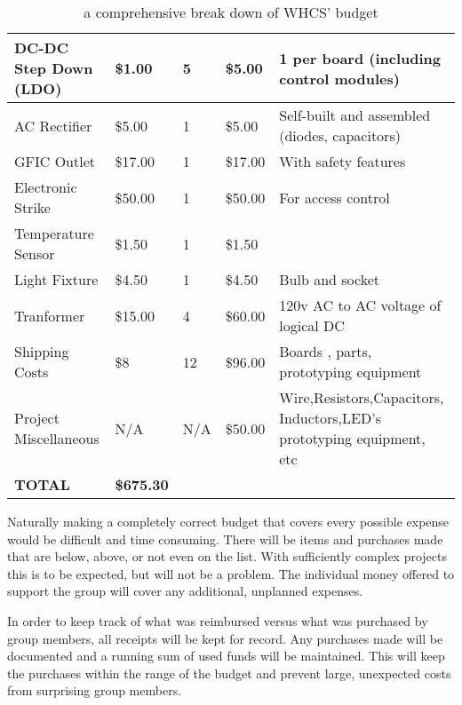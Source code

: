 \begin{table}[H]
{\begin{tabular}{|l|l|l|l|b{4cm}|}
{\color{black} DC{}-DC Step Down (LDO)} &
{\color{black} \$1.00} &
{\color{black} 5} &
{\color{black} \$5.00} &
{\color{black} 1 per board (including control modules)}\\\hline
{\color{black} AC Rectifier} &
{\color{black} \$5.00} &
{\color{black} 1} &
{\color{black} \$5.00} &
{\color{black} Self{}-built and assembled (diodes, capacitors)}\\\hline
{\color{black} GFIC Outlet} &
{\color{black} \$17.00} &
{\color{black} 1} &
{\color{black} \$17.00} &
{\color{black} With safety features}\\\hline
{\color{black} Electronic Strike} &
{\color{black} \$50.00} &
{\color{black} 1} &
{\color{black} \$50.00} &
{\color{black} For access control}\\\hline
{\color{black} Temperature Sensor} &
{\color{black} \$1.50} &
{\color{black} 1} &
{\color{black} \$1.50} &
\\\hline
{\color{black} Light Fixture} &
{\color{black} \$4.50} &
{\color{black} 1} &
{\color{black} \$4.50} &
{\color{black} Bulb and socket}\\\hline
{\color{black} Tranformer} &
{\color{black} \$15.00} &
{\color{black} 4} &
{\color{black} \$60.00} &
{\color{black} 120v AC to AC voltage of logical DC}\\\hline
{\color{black} Shipping Costs} &
{\color{black} \$8} &
{\color{black} 12} &
{\color{black} \$96.00} &
{\color{black} Boards , parts, prototyping equipment}\\\hline
{\color{black} Project Miscellaneous} &
{\color{black} N/A} &
{\color{black} N/A} &
{\color{black} \$50.00} &
{\color{black} Wire,Resistors,Capacitors, Inductors,LED{}'s prototyping equipment, etc}\\\hline
{\color{black} \textbf{TOTAL}} &
{\color{black} \textbf{\$675.30}} &
 &
 &
\\\hline
\end{tabular}
}
\caption{a comprehensive break down of WHCS' budget}
\label{tab:budget}
\end{table}

Naturally making a completely correct budget that covers every possible expense
would be difficult and time consuming. There will be items and purchases made
that are below, above, or not even on the list. With sufficiently complex
projects this is to be expected, but will not be a problem. The individual
money offered to support the group will cover any additional, unplanned
expenses.

In order to keep track of what was reimbursed versus what was purchased by
group members, all receipts will be kept for record. Any purchases made will be
documented and a running sum of used funds will be maintained. This will keep
the purchases within the range of the budget and prevent large, unexpected
costs from surprising group members.

